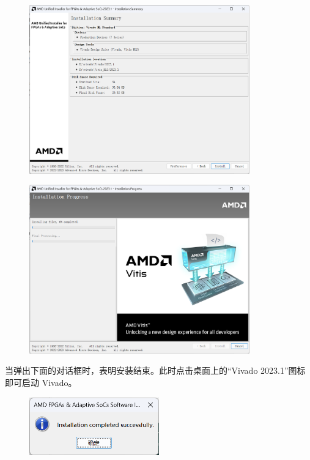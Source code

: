 \documentclass{ctexart}
\begin{document}
\begin{figure}[H]
    \centering
    \includegraphics[width=0.85\textwidth]{lab0/10.png}
\end{figure}

\begin{figure}[H]
    \centering
    \includegraphics[width=0.85\textwidth]{lab0/11.png}
\end{figure}

当弹出下面的对话框时，表明安装结束。此时点击桌面上的“Vivado 2023.1”图标即可启动 Vivado。

\begin{figure}[H]
    \centering
    \includegraphics[width=0.5\textwidth]{lab0/12.png}
\end{figure}
\end{document}

